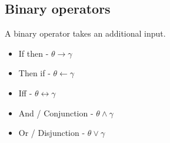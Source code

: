 \subsection{Binary operators}

A binary operator takes an additional input.

\begin{itemize}
\item If then - \(\theta \rightarrow \gamma \)
\item Then if - \(\theta \leftarrow \gamma \)
\item Iff - \(\theta \leftrightarrow \gamma \)
\item And / Conjunction - \(\theta \land \gamma \)
\item Or / Disjunction - \(\theta \lor \gamma \)
\end{itemize}


